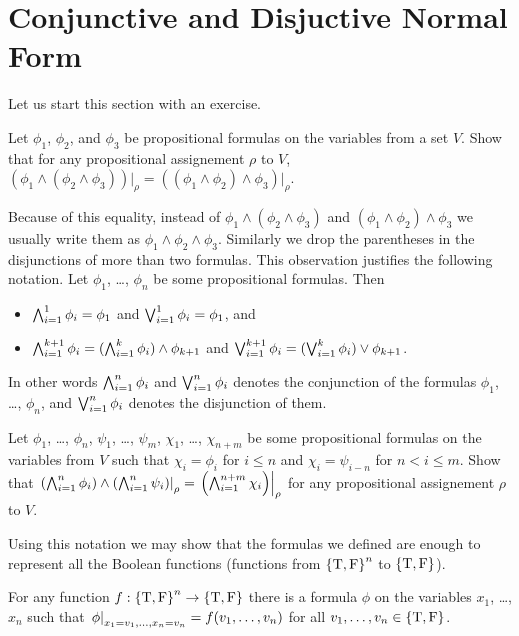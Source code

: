 \section{Conjunctive and Disjuctive Normal Form}

Let us start this section with an exercise.
\begin{exercise}
  Let $\phi_1$, $\phi_2$, and $\phi_3$ be propositional formulas on the
  variables from a set $V$. Show that for any propositional assignement
  $\rho$ to $V$,
  $(\phi_1 \land (\phi_2 \land \phi_3))\big\rvert_\rho =
   ((\phi_1 \land \phi_2) \land \phi_3)\big\rvert_\rho$.
\end{exercise}

Because of this equality, instead of $\phi_1 \land (\phi_2 \land \phi_3)$ and
$(\phi_1 \land \phi_2) \land \phi_3$ we usually write them
as $\phi_1 \land \phi_2 \land \phi_3$. Similarly we drop the
parentheses in the disjunctions of more than two formulas. This observation
justifies the following notation.
Let $\phi_1$, \dots, $\phi_n$ be some propositional formulas. Then
\begin{itemize}
  \item $\bigwedge_{i = 1}^1 \phi_i = \phi_1$ and
    $\bigvee_{i = 1}^1 \phi_i = \phi_1$, and
  \item $\bigwedge_{i = 1}^{k + 1} \phi_i =
    (\bigwedge_{i = 1}^{k} \phi_i) \land \phi_{k + 1}$ and
    $\bigvee_{i = 1}^{k + 1} \phi_i =
      (\bigvee_{i = 1}^{k} \phi_i) \lor \phi_{k + 1}$.
\end{itemize}
In other words $\bigwedge_{i = 1}^n \phi_i$ and $\bigvee_{i = 1}^n \phi_i$
denotes the conjunction of the formulas $\phi_1$, \dots, $\phi_n$, and
$\bigvee_{i = 1}^n \phi_i$ denotes the disjunction of them.

\begin{exercise}
  Let $\phi_1$, \dots, $\phi_n$, $\psi_1$, \dots, $\psi_m$, $\chi_1$, \dots,
  $\chi_{n + m}$ be some propositional formulas on the variables from $V$
  such that $\chi_i = \phi_i$ for $i \le n$ and $\chi_i = \psi_{i - n}$ for
  $n < i \le m$. Show that
  $\left. {\left(\bigwedge_{i = 1}^n \phi_i\right) \land
    \left(\bigwedge_{i = 1}^n \psi_i\right)} \right\rvert_{\rho} =
  \left. {\left(\bigwedge_{i = 1}^{n + m} \chi_i\right)} \right\rvert_{\rho}$
  for any propositional assignement $\rho$ to $V$.
\end{exercise}


Using this notation we may show that the formulas we defined are enough to
represent all the Boolean functions
(functions from $\set{\ltrue, \lfalse}^n$ to $\set{\ltrue, \lfalse}$).
\begin{theorem}
\label{theorem:function-to-formula}
  For any function $f : \set{\ltrue, \lfalse}^n \to
  \set{\ltrue, \lfalse}$ there is a
  formula $\phi$ on the variables $x_1$, \dots, $x_n$ such that
  $\left. {\phi} \right\rvert_{x_1 = v_1, \dots, x_n = v_n} = f(v_1, \dots, v_n)$ for all
  $v_1, \dots, v_n \in \set{\ltrue, \lfalse}$.
\end{theorem}

